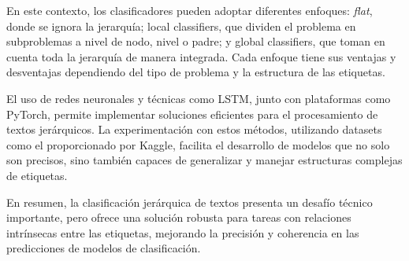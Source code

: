 \documentclass[12pt,letterpaper]{article}
\begin{document}
En este contexto, los clasificadores pueden adoptar diferentes enfoques: \textit{flat}, donde se ignora la jerarquía; local classifiers, que dividen el problema en subproblemas a nivel de nodo, nivel o padre; y global classifiers, que toman en cuenta toda la jerarquía de manera integrada. Cada enfoque tiene sus ventajas y desventajas dependiendo del tipo de problema y la estructura de las etiquetas.

El uso de redes neuronales y técnicas como LSTM, junto con plataformas como PyTorch, permite implementar soluciones eficientes para el procesamiento de textos jerárquicos. La experimentación con estos métodos, utilizando datasets como el proporcionado por Kaggle, facilita el desarrollo de modelos que no solo son precisos, sino también capaces de generalizar y manejar estructuras complejas de etiquetas.

En resumen, la clasificación jerárquica de textos presenta un desafío técnico importante, pero ofrece una solución robusta para tareas con relaciones intrínsecas entre las etiquetas, mejorando la precisión y coherencia en las predicciones de modelos de clasificación.
\end{document}
